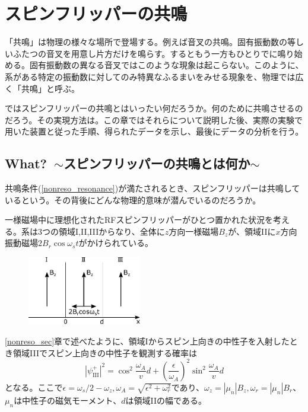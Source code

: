 \section{スピンフリッパーの共鳴}

「共鳴」は物理の様々な場所で登場する。例えば音叉の共鳴。固有振動数の等しいふたつの音叉を用意し片方だけを鳴らす。するともう一方もひとりでに鳴り始める。固有振動数の異なる音叉ではこのような現象は起こらない。このように、系がある特定の振動数に対してのみ特異なふるまいをみせる現象を、物理では広く「共鳴」と呼ぶ。

ではスピンフリッパーの共鳴とはいったい何だろうか。何のために共鳴させるのだろう。その実現方法は。この章ではそれらについて説明した後、実際の実験で用いた装置と従った手順、得られたデータを示し、最後にデータの分析を行う。

\subsection{What?\ $\sim$スピンフリッパーの共鳴とは何か$\sim$} \label{Resonance_what}
共鳴条件(\ref{nonreso_resonance})が満たされるとき、スピンフリッパーは共鳴しているという。その背後にどんな物理的意味が潜んでいるのだろうか。

一様磁場中に理想化されたRFスピンフリッパーがひとつ置かれた状況を考える。系は3つの領域I,II,IIIからなり、全体に$z$方向一様磁場$B_z$が、領域IIに$x$方向振動磁場$2B_r \cos \omega_s t$がかけられている。
\begin{figure}[h]
\centering
\includegraphics[height=3cm]{resonance/whatwhyhow/Resonance_what_setting.pdf}
\end{figure}

\ref{nonreso_sec}章で述べたように、領域Iからスピン上向きの中性子を入射したとき領域IIIでスピン上向きの中性子を観測する確率は
\begin{equation}
|\psi_{\mathrm{III}}^+|^2=\cos^2 \frac{\omega_A}{v}d+\left(\frac{\epsilon}{\omega_A}\right)^2\sin^2\frac{\omega_A}{v}d \label{Resonance_flip}
\end{equation}
となる。ここで$\epsilon=\omega_s/2-\omega_z,\omega_A=\sqrt{\epsilon^2+\omega_r^2}$であり、$\omega_z=|\mu_n|B_z,\omega_r=|\mu_n|B_r$、$\mu_n$は中性子の磁気モーメント、$d$は領域IIの幅である。

